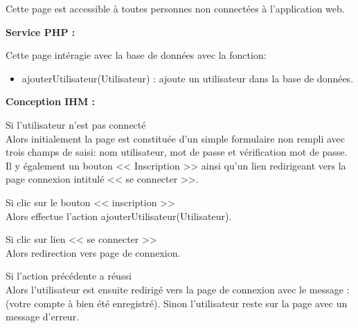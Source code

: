			\begin{paragraphe}
				Cette page est accessible à toutes personnes non connectées à l'application web.
			\end{paragraphe}

			\begin{paragraphe}
				\textbf{Service PHP :}
			\end{paragraphe}

			\begin{paragraphe}
			    Cette page intéragie avec la base de données avec la fonction:
				\begin{itemize}
					\item ajouterUtilisateur(Utilisateur) : ajoute un utilisateur dans la base de données.
				\end{itemize}
			\end{paragraphe}

			\begin{paragraphe}
				\textbf{Conception IHM :}
			\end{paragraphe}

			\begin{paragraphe}
				Si l'utilisateur n'est pas connecté \\
				Alors initialement la page est constituée d'un simple formulaire non rempli avec trois champs de saisi: nom utilisateur, mot de passe et vérification mot de passe.
				Il y également un bouton << Inscription >> ainsi qu'un lien redirigeant vers la page connexion intitulé << se connecter >>.
			\end{paragraphe}


			\begin{paragraphe}
				Si clic sur le bouton << inscription >> \\
				Alors effectue l'action ajouterUtilisateur(Utilisateur).
			\end{paragraphe}

           \begin{paragraphe}
                Si clic sur lien << se connecter >> \\
                Alors redirection vers page de connexion.
            \end{paragraphe}

			\begin{paragraphe}
				Si l'action précédente a réussi \\
				Alors l'utilisateur est ensuite redirigé vers la page de connexion avec le message : (votre compte à bien été enregistré).
				Sinon l'utilisateur reste sur la page avec un message d'erreur.
			\end{paragraphe}

